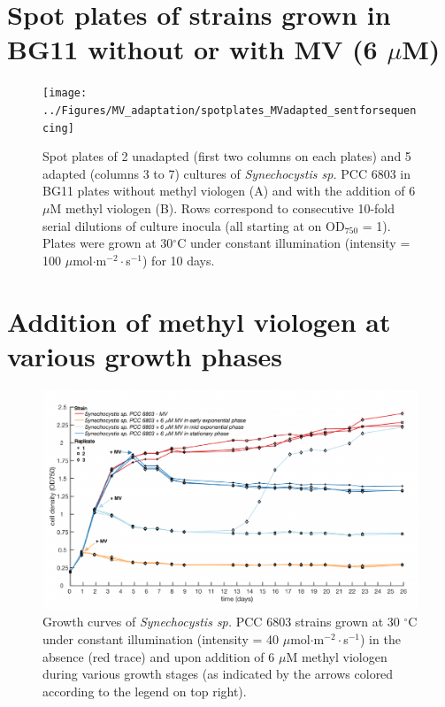\documentclass[12pt]{article}
\begin{document}
\section{Spot plates of strains grown in BG11 without or with MV (6 $\mu$M)}

\begin{figure}[H]
    \centering
    \texttt{[image: ../Figures/MV\_adaptation/spotplates\_MVadapted\_sentforsequencing]}
    \caption{Spot plates of 2 unadapted (first two columns on each plates) and 5 adapted (columns 3 to 7) cultures of \textit{Synechocystis sp.} PCC 6803 in BG11 plates without methyl viologen (A) and with the addition of 6 $\mu$M  methyl viologen (B). Rows correspond to consecutive 10-fold serial dilutions of culture inocula (all starting at on OD$_{750}$ = 1). Plates were grown at 30$^\circ$C under constant illumination (intensity = 100 $\mu$mol$\cdot$m$^{-2}\cdot$s$^{-1}$) for 10 days.}
    \label{fig:spotassayMV}
\end{figure}


\section{Addition of methyl viologen at various growth phases}

\begin{figure}[H]
    \centering
    \includegraphics[width=\hsize]{../Figures/MV_adaptation/growthcurves_growthstages_Howe.pdf}
    \caption{Growth curves of \textit{Synechocystis sp.} PCC 6803 strains grown at 30 $^\circ$C under constant illumination (intensity = 40 $\mu$mol$\cdot$m$^{-2}\cdot$s$^{-1}$) in the absence (red trace) and upon addition  of 6 $\mu$M  methyl viologen during various growth stages (as indicated by the arrows colored according to the legend on top right).}
    \label{fig:MVgrowthstages}
\end{figure}
\end{document}
